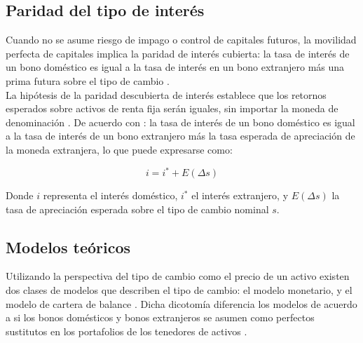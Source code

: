 	\subsection{Paridad del tipo de interés}
	Cuando no se asume riesgo de impago o control de capitales futuros, la movilidad perfecta de capitales implica la paridad de interés cubierta: la tasa de interés de un bono doméstico es igual a la tasa de interés en un bono extranjero más una prima futura sobre el tipo de cambio \parencite{frankel1993exchange}.\\
	
	La hipótesis de la paridad descubierta de interés establece que los retornos esperados sobre activos de renta fija serán iguales, sin importar la moneda de denominación \parencite{boughton1988monetary}. De acuerdo con \textcite{frankel1993exchange}: la tasa de interés de un bono doméstico es igual a la tasa de interés de un bono extranjero más la tasa esperada de apreciación de la moneda extranjera, lo que puede expresarse como: 
	
	\begin{equation}
	i = i^* + E(\Delta s)
	\label{uip}
	\end{equation}
	
	Donde $i$ representa el interés doméstico, $i^*$ el interés extranjero, y $E(\Delta s)$ la tasa de apreciación esperada sobre el tipo de cambio nominal $s$.
	
	
	
	\subsection{Modelos teóricos}
	
	Utilizando la perspectiva del tipo de cambio como el precio de un activo existen dos clases de modelos que describen el tipo de cambio: el modelo monetario, y el modelo de cartera de balance \parencite{exchecon}. Dicha dicotomía diferencia los modelos de acuerdo a si los bonos domésticos y bonos extranjeros se asumen como perfectos sustitutos en los portafolios de los tenedores de activos \parencite{frankel1993exchange}.\\
	
